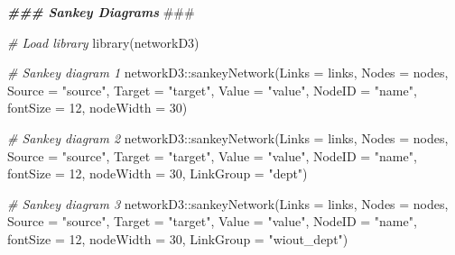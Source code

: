 \documentclass[
]{book}
\newenvironment{Shaded}{\begin{snugshade}}{\end{snugshade}}
\newcommand{\AlertTok}[1]{\textcolor[rgb]{0.94,0.16,0.16}{#1}}
\newcommand{\AttributeTok}[1]{\textcolor[rgb]{0.77,0.63,0.00}{#1}}
\newcommand{\CommentTok}[1]{\textcolor[rgb]{0.56,0.35,0.01}{\textit{#1}}}
\newcommand{\DecValTok}[1]{\textcolor[rgb]{0.00,0.00,0.81}{#1}}
\newcommand{\DocumentationTok}[1]{\textcolor[rgb]{0.56,0.35,0.01}{\textbf{\textit{#1}}}}
\newcommand{\FunctionTok}[1]{\textcolor[rgb]{0.00,0.00,0.00}{#1}}
\newcommand{\NormalTok}[1]{#1}
\newcommand{\SpecialCharTok}[1]{\textcolor[rgb]{0.00,0.00,0.00}{#1}}
\newcommand{\StringTok}[1]{\textcolor[rgb]{0.31,0.60,0.02}{#1}}
\begin{document}
\begin{Shaded}
\begin{Highlighting}[]
\DocumentationTok{\#\#\# Sankey Diagrams }\AlertTok{\#\#\#}

\CommentTok{\# Load library}
\FunctionTok{library}\NormalTok{(networkD3)}

\CommentTok{\# Sankey diagram 1}
\NormalTok{networkD3}\SpecialCharTok{::}\FunctionTok{sankeyNetwork}\NormalTok{(}\AttributeTok{Links =}\NormalTok{ links,}
                         \AttributeTok{Nodes =}\NormalTok{ nodes,}
                         \AttributeTok{Source =} \StringTok{"source"}\NormalTok{, }
                         \AttributeTok{Target =} \StringTok{"target"}\NormalTok{,}
                         \AttributeTok{Value =} \StringTok{"value"}\NormalTok{, }
                         \AttributeTok{NodeID =} \StringTok{"name"}\NormalTok{,}
                         \AttributeTok{fontSize =} \DecValTok{12}\NormalTok{, }
                         \AttributeTok{nodeWidth =} \DecValTok{30}\NormalTok{)}

\CommentTok{\# Sankey diagram 2}
\NormalTok{networkD3}\SpecialCharTok{::}\FunctionTok{sankeyNetwork}\NormalTok{(}\AttributeTok{Links =}\NormalTok{ links,}
                         \AttributeTok{Nodes =}\NormalTok{ nodes,}
                         \AttributeTok{Source =} \StringTok{"source"}\NormalTok{, }
                         \AttributeTok{Target =} \StringTok{"target"}\NormalTok{,}
                         \AttributeTok{Value =} \StringTok{"value"}\NormalTok{, }
                         \AttributeTok{NodeID =} \StringTok{"name"}\NormalTok{,}
                         \AttributeTok{fontSize =} \DecValTok{12}\NormalTok{, }
                         \AttributeTok{nodeWidth =} \DecValTok{30}\NormalTok{, }
                         \AttributeTok{LinkGroup =} \StringTok{"dept"}\NormalTok{)}

\CommentTok{\# Sankey diagram 3}
\NormalTok{networkD3}\SpecialCharTok{::}\FunctionTok{sankeyNetwork}\NormalTok{(}\AttributeTok{Links =}\NormalTok{ links,}
                         \AttributeTok{Nodes =}\NormalTok{ nodes,}
                         \AttributeTok{Source =} \StringTok{"source"}\NormalTok{, }
                         \AttributeTok{Target =} \StringTok{"target"}\NormalTok{,}
                         \AttributeTok{Value =} \StringTok{"value"}\NormalTok{, }
                         \AttributeTok{NodeID =} \StringTok{"name"}\NormalTok{,}
                         \AttributeTok{fontSize =} \DecValTok{12}\NormalTok{, }
                         \AttributeTok{nodeWidth =} \DecValTok{30}\NormalTok{, }
                         \AttributeTok{LinkGroup =} \StringTok{"wiout\_dept"}\NormalTok{)}


\end{Highlighting}
\end{Shaded}
\end{document}
